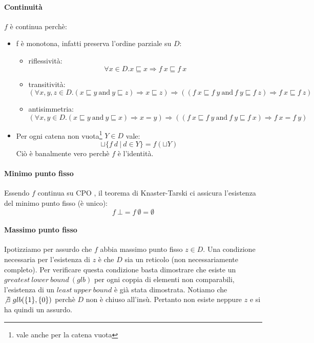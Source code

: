 \paragraph{Continuità} $f$ è continua perchè: 
\begin{itemize}
  \item f è monotona, infatti preserva l'ordine parziale su $D$:
  \begin{itemize}
    \item riflessività:
    $$
      \forall x \in D.x \sqsubseteq x \Rightarrow f\ x \sqsubseteq f\ x
    $$
    \item transitività:
    $$
      (\forall x,y,z \in D.(x \sqsubseteq y\ \text{and}\ y \sqsubseteq z) \Rightarrow
      x \sqsubseteq z)
      \Rightarrow 
      ((f\ x \sqsubseteq f\ y\ \text{and}\ f\ y \sqsubseteq f\ z) \Rightarrow
      f\ x \sqsubseteq f\ z)
    $$
    \item antisimmetria:
     $$
      (\forall x,y \in D.(x \sqsubseteq y\ \text{and}\ y \sqsubseteq x) \Rightarrow
      x = y)
      \Rightarrow 
      ((f\ x \sqsubseteq f\ y\ \text{and}\ f\ y \sqsubseteq f\ x) \Rightarrow
      f\ x = f\ y)
    $$
  \end{itemize}
  \item Per ogni catena non vuota\footnote{vale anche per la catena vuota} $Y \in D$ vale:
    $$ 
      \sqcup\{f\ d\ |\ d \in Y\} = f(\sqcup Y)
    $$
    Ciò è banalmente vero perchè $f$ è l'identità.
\end{itemize}
\paragraph{Minimo punto fisso}
Essendo $f$ continua su CPO , il teorema di Knaster-Tarski ci 
assicura l'esistenza del minimo punto fisso (è unico):  
$$
f\ \bot = f\ \emptyset = \emptyset
$$

\paragraph{Massimo punto fisso}
Ipotizziamo per assurdo che $f$ abbia massimo punto fisso $z \in D$.
Una condizione necessaria per l'esistenza di $z$ è che $D$ sia un reticolo 
(non necessariamente completo). Per verificare questa condizione basta dimostrare che esiste un $greatest\ lower\ bound\ (glb)$ per ogni coppia di elementi non comparabili, l'esistenza di un $least\ upper\ bound$ è già stata dimostrata. Notiamo che $\not \exists\ glb(\{1\},\{0\})$ perchè $D$ non è chiuso all'insù. Pertanto non esiste neppure $z$ e si ha quindi un assurdo.
\cvd
